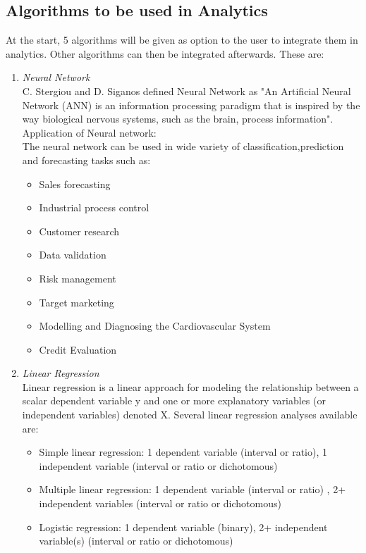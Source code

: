 \documentclass[a4paper,12pt]{report}
\begin{document}
    \subsection{Algorithms to be used in Analytics}
    At the start, 5 algorithms will be given as option to the user to integrate them in analytics. Other algorithms can then be integrated afterwards. These are:
    \begin{enumerate}
    	\item \emph{Neural Network}\\
    	C. Stergiou and D. Siganos \cite{nano8} defined Neural Network as "An Artificial Neural Network (ANN) is an information processing paradigm that is inspired by the way biological nervous systems, such as the brain, process information". \\
    	Application of Neural network:\\ 
    	The neural network can be used in wide variety of classification,prediction and forecasting tasks such as:
    	\begin{itemize}
    		\item Sales forecasting
    		\item Industrial process control
    		\item Customer research
    		\item Data validation
    		\item Risk management
    		\item Target marketing
    		\item Modelling and Diagnosing the Cardiovascular System
    		\item Credit Evaluation      
      \end{itemize}
      
    	\item \emph{Linear Regression}\\
    	Linear regression is a linear approach for modeling the relationship between a scalar dependent variable y and one or more explanatory variables (or independent variables) denoted X. Several linear regression analyses available are:
    	\begin{itemize}
    		\item Simple linear regression:
    		1 dependent variable (interval or ratio), 1 independent variable (interval or ratio or dichotomous)
    		\item Multiple linear regression:
    		1 dependent variable (interval or ratio) , 2+ independent variables (interval or ratio or dichotomous)
    		\item Logistic regression:
    		1 dependent variable (binary), 2+ independent variable(s) (interval or ratio or dichotomous)     
      \end{itemize}
      

\end{enumerate}
\end{document}
